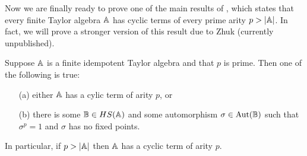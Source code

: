 \documentclass[letterpaper,11pt]{article}
\DeclareMathOperator{\Aut}{Aut}
\begin{document}
Now we are finally ready to prove one of the main results of \cite{cyclic}, which states that every finite Taylor algebra $\mathbb{A}$ has cyclic terms of every prime arity $p > |\mathbb{A}|$. In fact, we will prove a stronger version of this result due to Zhuk (currently unpublished).

\begin{thm}\label{cyclic-terms} Suppose $\mathbb{A}$ is a finite idempotent Taylor algebra and that $p$ is prime. Then one of the following is true:
\begin{itemize}
\item[(a)] either $\mathbb{A}$ has a cylic term of arity $p$, or
\item[(b)] there is some $\mathbb{B} \in HS(\mathbb{A})$ and some automorphism $\sigma \in \Aut(\bB)$ such that $\sigma^p = 1$ and $\sigma$ has no fixed points.
\end{itemize}
In particular, if $p > |\mathbb{A}|$ then $\mathbb{A}$ has a cyclic term of arity $p$.
\end{thm}
\end{document}
